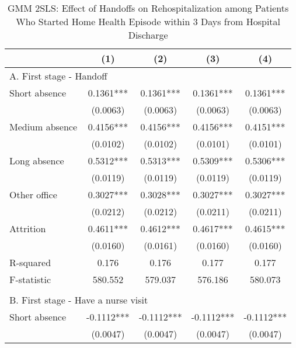 \documentclass[final,12pt, notitlepage]{article}
\begin{document}
\begin{singlespace}
\begin{table}[H]
\footnotesize
\setlength\tabcolsep{0pt}
\centering
\caption{GMM 2SLS: Effect of Handoffs on Rehospitalization among Patients Who Started Home Health Episode within 3 Days from Hospital Discharge}
\label{tab:iv_days_fromhospdc}
\begin{threeparttable}
{
\def\sym#1{\ifmmode^{#1}\else\(^{#1}\)\fi}
\begin{tabular*}{\textwidth}{l@{\extracolsep{\fill}}*{4}{c}} %
\toprule
                    &\multicolumn{1}{c}{(1)}&\multicolumn{1}{c}{(2)}&\multicolumn{1}{c}{(3)}&\multicolumn{1}{c}{(4)}\\
\midrule
\multicolumn{5}{l}{A. First stage - Handoff} \\
Short absence       &      0.1361***&      0.1361***&      0.1361***&      0.1361***\\
                    &    (0.0063)   &    (0.0063)   &    (0.0063)   &    (0.0063)   \\
Medium absence      &      0.4156***&      0.4156***&      0.4156***&      0.4151***\\
                    &    (0.0102)   &    (0.0102)   &    (0.0101)   &    (0.0101)   \\
Long absence        &      0.5312***&      0.5313***&      0.5309***&      0.5306***\\
                    &    (0.0119)   &    (0.0119)   &    (0.0119)   &    (0.0119)   \\
Other office        &      0.3027***&      0.3028***&      0.3027***&      0.3027***\\
                    &    (0.0212)   &    (0.0212)   &    (0.0211)   &    (0.0211)   \\
Attrition           &      0.4611***&      0.4612***&      0.4617***&      0.4615***\\
                    &    (0.0160)   &    (0.0161)   &    (0.0160)   &    (0.0160)   \\
R-squared           &       0.176   &       0.176   &       0.177   &       0.177   \\
F-statistic         &     580.552   &     579.037   &     576.186   &     580.073   \\
\\
\multicolumn{5}{l}{B. First stage - Have a nurse visit} \\
Short absence       &     -0.1112***&     -0.1112***&     -0.1112***&     -0.1112***\\
                    &    (0.0047)   &    (0.0047)   &    (0.0047)   &    (0.0047)   \\

\end{tabular*}}
\end{threeparttable}
\end{table}
\end{singlespace}
\end{document}
